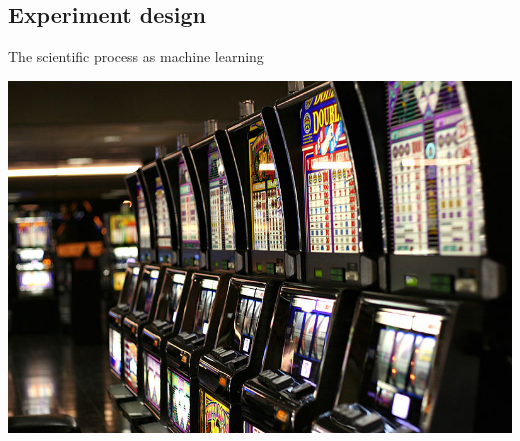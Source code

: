 \documentclass{beamer}
\begin{document}
\subsection{Experiment design}
\begin{frame}
  \centering
  \Huge{The scientific process as machine learning}
\end{frame}
\begin{frame}
  \centering
  \includegraphics[width=\textwidth]{../figures/Las_Vegas_slot_machines}
\end{frame}
\end{document}
